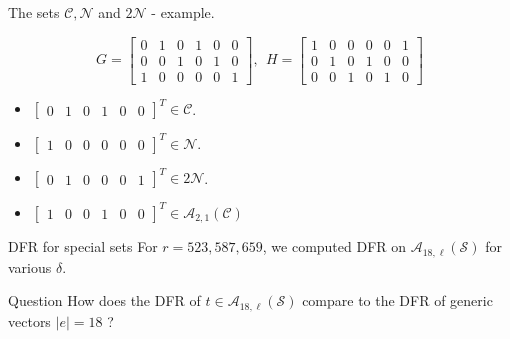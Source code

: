 \begin{frame}{The sets $\mathcal{C},\mathcal{N}$ and $ 2\mathcal{N}$ - example.}
    
    \[
G = \begin{bmatrix}
0 & 1 & 0 & 1 & 0 & 0 \\
0 & 0 & 1 & 0 & 1 & 0 \\
1 & 0 & 0 & 0 & 0 & 1
\end{bmatrix}, \ \ 
H = \begin{bmatrix}
1 & 0 & 0 & 0 & 0 & 1 \\
0 & 1 & 0 & 1 & 0 & 0 \\
0 & 0 & 1 & 0 & 1 & 0
\end{bmatrix}
\]

\begin{itemize}
    \item $\begin{bmatrix} 0 & 1 & 0 & 1 & 0 & 0 \end{bmatrix}^T \in \mathcal{C}$.
    \item $\begin{bmatrix} 1 & 0 & 0 & 0 & 0 & 0 \end{bmatrix}^T \in \mathcal{N}$.
    \item $\begin{bmatrix} 0 & 1 & 0 & 0 & 0 & 1 \end{bmatrix}^T \in 2\mathcal{N}$.
    \item $\begin{bmatrix} 1 & 0 & 0 & 1 & 0 & 0 \end{bmatrix}^T \in \mathcal{A}_{2,1}(\mathcal{C})$
\end{itemize}


\end{frame}


\begin{frame}{DFR for special sets}
    For $r = 523,587,659$, we computed DFR on $\mathcal{A}_{18,\ell}(\mathcal{S})$ for various $\delta$.
    
    \begin{block}{Question}
    How does the DFR of $t \in \mathcal{A}_{18,\ell}(\mathcal{S})$ compare to the DFR of generic vectors $|e| = 18$ ?
    \end{block}
\end{frame}

